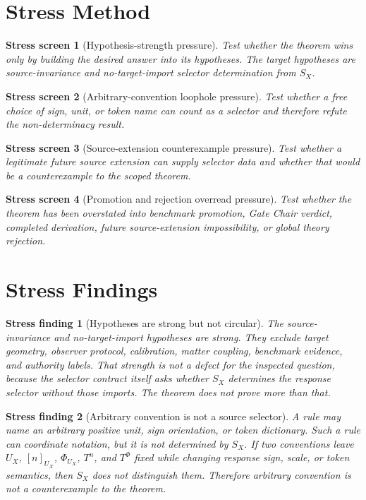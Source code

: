 \documentclass[11pt]{article}
\newtheorem{stressscreen}{Stress screen}
\newtheorem{stressfinding}{Stress finding}
\begin{document}
\section{Stress Method}

\begin{stressscreen}[Hypothesis-strength pressure]
Test whether the theorem wins only by building the desired answer into
its hypotheses. The target hypotheses are source-invariance and
no-target-import selector determination from \(S_X\).
\end{stressscreen}

\begin{stressscreen}[Arbitrary-convention loophole pressure]
Test whether a free choice of sign, unit, or token name can count as a
selector and therefore refute the non-determinacy result.
\end{stressscreen}

\begin{stressscreen}[Source-extension counterexample pressure]
Test whether a legitimate future source extension can supply selector
data and whether that would be a counterexample to the scoped theorem.
\end{stressscreen}

\begin{stressscreen}[Promotion and rejection overread pressure]
Test whether the theorem has been overstated into benchmark promotion,
Gate Chair verdict, completed derivation, future source-extension
impossibility, or global theory rejection.
\end{stressscreen}

\section{Stress Findings}

\begin{stressfinding}[Hypotheses are strong but not circular]
The source-invariance and no-target-import hypotheses are strong. They
exclude target geometry, observer protocol, calibration, matter
coupling, benchmark evidence, and authority labels. That strength is
not a defect for the inspected question, because the selector contract
itself asks whether \(S_X\) determines the response selector without
those imports. The theorem does not prove more than that.
\end{stressfinding}

\begin{stressfinding}[Arbitrary convention is not a source selector]
A rule may name an arbitrary positive unit, sign orientation, or token
dictionary. Such a rule can coordinate notation, but it is not
determined by \(S_X\). If two conventions leave \(U_X\), \([n]_{U_X}\),
\(\Phi_{U_X}\), \(T^n\), and \(T^\Phi\) fixed while changing response
sign, scale, or token semantics, then \(S_X\) does not distinguish
them. Therefore arbitrary convention is not a counterexample to the
theorem.
\end{stressfinding}
\end{document}
